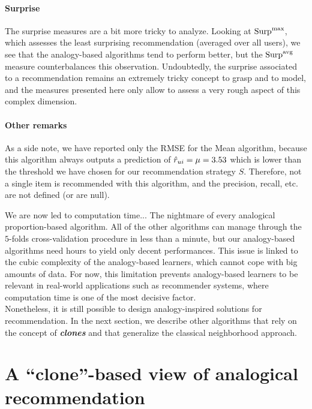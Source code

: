 \paragraph{Surprise\\}
The surprise measures are a bit more tricky to analyze. Looking at $\text{Surp}^{\text{max}}$,
which assesses the least surprising recommendation (averaged over all users), we
see that the analogy-based algorithms tend to perform better, but the
$\text{Surp}^{\text{avg}}$ measure counterbalances this observation. Undoubtedly, the surprise
associated to a recommendation remains an extremely tricky concept to grasp and
to model, and the measures presented here only allow to assess a very rough
aspect of this complex dimension.

\paragraph{Other remarks\\}

As a side note, we have reported only the RMSE for the Mean algorithm, because
this algorithm always outputs a prediction of $\hat{r}_{ui} = \mu = 3.53$ which is
lower than the threshold we have chosen for our recommendation strategy $S$.
Therefore, not a single item is recommended with this algorithm, and the
precision, recall, etc. are not defined (or are null).

We are now led to computation time... The nightmare of every analogical
proportion-based algorithm. All of the other algorithms can manage through the
$5$-folds cross-validation procedure in less than a minute, but our
analogy-based algorithms need hours to yield only decent performances. This
issue is linked to the cubic complexity of the analogy-based learners, which
cannot cope with big amounts of data. For now, this limitation prevents
analogy-based learners to be relevant in real-world applications such as
recommender systems, where computation time is one of the most decisive
factor.\\

Nonetheless, it is still possible to design analogy-inspired solutions for
recommendation. In the next section, we describe other algorithms that rely on
the concept of \textbf{\textit{clones}} and that generalize the classical neighborhood
approach.

\section{A ``clone''-based view of analogical recommendation}
\label{SEC:clone_based_view}


